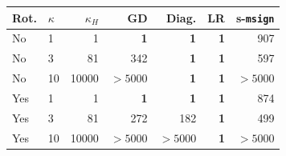 \footnotesize
\begin{tabular}{llrrrrr}
\toprule
Rot. & $\kappa$ & $\kappa_H$ & GD & Diag. & LR & s-\texttt{msign} \\
\midrule
No & 1 & 1 & \textbf{1} & \textbf{1} & \textbf{1} & 907 \\
No & 3 & 81 & 342 & \textbf{1} & \textbf{1} & 597 \\
No & 10 & 10000 & $>5000$ & \textbf{1} & \textbf{1} & $>5000$ \\
Yes & 1 & 1 & \textbf{1} & \textbf{1} & \textbf{1} & 874 \\
Yes & 3 & 81 & 272 & 182 & \textbf{1} & 499 \\
Yes & 10 & 10000 & $>5000$ & $>5000$ & \textbf{1} & $>5000$ \\
\bottomrule
\end{tabular}
